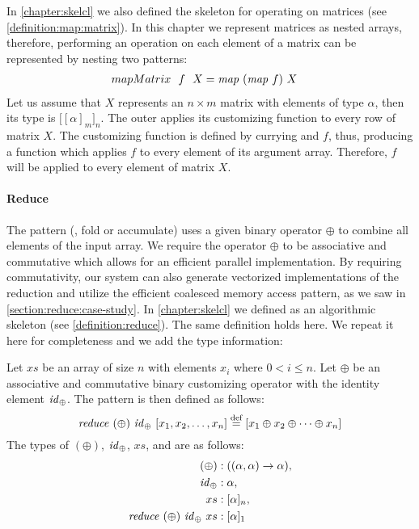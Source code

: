 \noindent
In \autoref{chapter:skelcl} we also defined the \map skeleton for operating on matrices (see \autoref{definition:map:matrix}).
In this chapter we represent matrices as nested arrays, therefore, performing an operation on each element of a matrix can be represented by nesting two \map patterns:
\begin{align*}
  mapMatrix\ \ f\ \ X &= \text{\textit{map}}\ (\text{\textit{map}}\ f)\ X
\end{align*}
Let us assume that $X$ represents an $n\times m$ matrix with elements of type $\alpha$, then its type is $\big[[\alpha]_m\big]_n$.
The outer \map applies its customizing function to every row of matrix $X$.
The customizing function is defined by currying \map and $f$, thus, producing a function which applies $f$ to every element of its argument array.
Therefore, $f$ will be applied to every element of matrix $X$.

\paragraph{Reduce}
The \reduce pattern (\aka, fold or accumulate) uses a given binary operator $\oplus$ to combine all elements of the input array.
We require the operator $\oplus$ to be associative and commutative which allows for an efficient parallel implementation.
By requiring commutativity, our system can also generate vectorized implementations of the reduction and utilize the efficient coalesced memory access pattern, as we saw in \autoref{section:reduce:case-study}.
In \autoref{chapter:skelcl} we defined \reduce as an algorithmic skeleton (see \autoref{definition:reduce}).
The same definition holds here.
We repeat it here for completeness and we add the type information:
\begin{definition}
  \label{definition:pattern:reduce}
  Let $xs$ be an array of size $n$ with elements $x_i$ where $0 < i \leq n$.
  Let $\oplus$ be an associative and commutative binary customizing operator with the identity element $\text{\textit{id}}_\oplus$.
  The \reduce pattern is then defined as follows:
  \begin{equation*}
    \text{\textit{reduce}}\ (\oplus)\ \text{\textit{id}}_\oplus\ [x_1, x_2, \dots, x_n]
      \stackrel{\textrm{\scriptsize def}}{=} [x_1 \oplus x_2 \oplus \dots \oplus x_n]
  \end{equation*}
  The types of $(\oplus)$, $\text{\textit{id}}_\oplus$, $xs$, and \reduce are as follows:
  \begin{align*}
    (\oplus) &: ((\alpha, \alpha) \rightarrow \alpha),\\
    \text{\textit{id}}_\oplus &: \alpha,\\
    xs &: [\alpha]_n,\\
    \text{\textit{reduce}}\ (\oplus)\ \text{\textit{id}}_\oplus\ xs &: [\alpha]_1
  \end{align*}
\end{definition}


